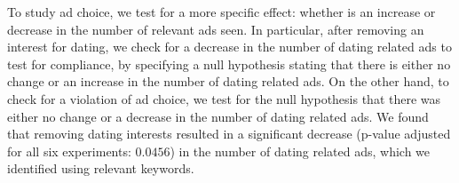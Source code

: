 \documentclass[10pt, onecolumn]{report}
\begin{document}


To study ad choice, we test for a more specific effect: whether is an increase 
or decrease in the number of relevant ads seen.
In particular, after removing an interest for dating, we check for a decrease
in the number of dating related ads to test for compliance, by
specifying a null hypothesis stating that there is either no change or an 
increase in the number of dating related ads. %
On the other hand, to check for a violation of ad choice, we test for the null hypothesis 
that there was either no change or a decrease in the number of dating related ads.
We found that removing dating interests resulted in a significant decrease 
(p-value adjusted for all six experiments: $0.0456$) in the number of dating
related ads, which we identified using relevant keywords. 
\end{document}
